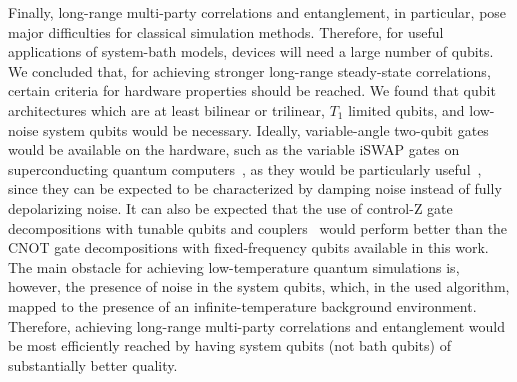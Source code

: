 \documentclass[twocolumn,amsmath,amssymb,pra]{revtex4-2}
\begin{document}
Finally, long-range multi-party correlations and entanglement, in particular, pose major difficulties for classical simulation methods.
Therefore, for useful applications of system-bath models, devices will need a large number of qubits.
We concluded that, for achieving stronger long-range steady-state correlations,
certain criteria for hardware properties should be reached.
We found that qubit architectures which are at least bilinear or trilinear, $T_1$ limited qubits, and low-noise system qubits would be necessary.
Ideally, variable-angle two-qubit gates would be available on the hardware,
such as the variable iSWAP gates on superconducting quantum computers~\cite{Mi2023}, as they would be particularly useful~\cite{Leppakangas2023},
since they can be expected to be characterized by damping noise instead of fully depolarizing noise.
It can also be expected that the use of control-Z gate decompositions
with tunable qubits and couplers~\cite{Mi2023} would perform better than the CNOT gate decompositions with fixed-frequency qubits available in this work.
The main obstacle for achieving low-temperature quantum simulations
is, however, the presence of noise in the system qubits, which, in the used algorithm, mapped to the presence of an infinite-temperature background environment.
Therefore, achieving long-range multi-party correlations and entanglement would be most efficiently reached by 
having system qubits (not bath qubits) of substantially better quality. %












%






\appendix



\end{document}
